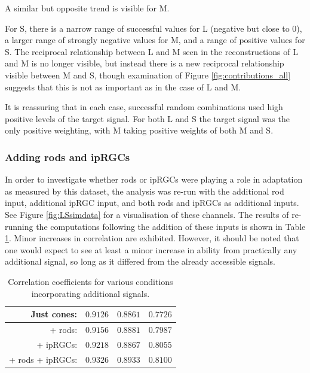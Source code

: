 A similar but opposite trend is visible for M.

For S, there is a narrow range of successful values for L (negative but close to 0), a larger range of strongly negative values for M, and a range of positive values for S. The reciprocal relationship between L and M seen in the reconstructions of L and M is no longer visible, but instead there is a new reciprocal relationship visible between M and S, though examination of Figure \ref{fig:contributions_all} suggests that this is not as important as in the case of L and M.

It is reassuring that in each case, successful random combinations used high positive levels of the target signal. For both L and S the target signal was the only positive weighting, with M taking positive weights of both M and S. 

\subsubsection{Adding rods and ipRGCs}

In order to investigate whether rods or \glspl{ipRGC} were playing a role in adaptation as measured by this dataset, the analysis was re-run with the additional rod input, additional \gls{ipRGC} input, and both rods and \glspl{ipRGC} as additional inputs. See Figure \ref{fig:LSsimdata} for a visualisation of these channels. The results of re-running the computations following the addition of these inputs is shown in Table \ref{tab:plusres}. Minor increases in correlation are exhibited. However, it should be noted that one would expect to see at least a minor increase in ability from practically any additional signal, so long as it differed from the already accessible signals.

\begin{table}[hbtp]
\centering
\begin{tabular}{|r|r|r|r|}
\hline
Just cones: & $0.9126$ & $0.8861$ & $0.7726$ \\ \hline
+ rods: & $0.9156$ & $0.8881$ & $0.7987$ \\ \hline
+ ipRGCs: & $0.9218$ & $0.8867$ & $0.8055$ \\ \hline
+ rods + ipRGCs: & $0.9326$ & $0.8933$ &$0.8100$ \\ \hline
\end{tabular} %
\caption{Correlation coefficients for various conditions incorporating additional signals.}
\label{tab:plusres}
\end{table}

